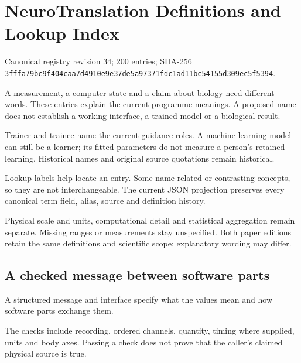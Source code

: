 \section*{NeuroTranslation Definitions and Lookup Index}
\label{programme-definitions}
\noindent Canonical registry revision 34; 200 entries; SHA-256 \texttt{3fffa79b\allowbreak{}c9f404ca\allowbreak{}a7d4910e\allowbreak{}9e37de5a\allowbreak{}97371fdc\allowbreak{}1ad11bc5\allowbreak{}4155d309\allowbreak{}ec5f5394}.\par
\noindent A measurement, a computer state and a claim about biology need different words. These entries explain the current programme meanings. A proposed name does not establish a working interface, a trained model or a biological result.\par
\noindent Trainer and trainee name the current guidance roles. A machine-learning model can still be a learner; its fitted parameters do not measure a person's retained learning. Historical names and original source quotations remain historical.\par
\noindent Lookup labels help locate an entry. Some name related or contrasting concepts, so they are not interchangeable. The current JSON projection preserves every canonical term field, alias, source and definition history.\par
\noindent Physical scale and units, computational detail and statistical aggregation remain separate. Missing ranges or measurements stay unspecified. Both paper editions retain the same definitions and scientific scope; explanatory wording may differ.\par

\begin{samepage}
\subsection*{A checked message between software parts}
\noindent A structured message and interface specify what the values mean and how software parts exchange them.\par
\end{samepage}
\begin{samepage}
\noindent The checks include recording, ordered channels, quantity, timing where supplied, units and body axes. Passing a check does not prove that the caller’s claimed physical source is true.\par\nopagebreak[4]

\end{samepage}


